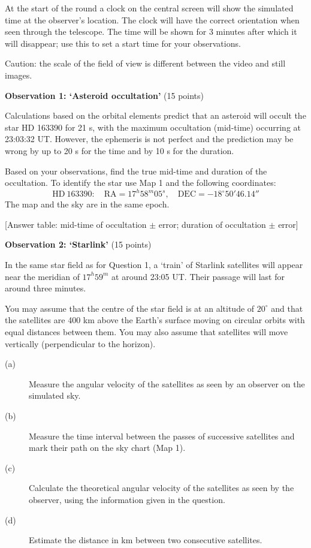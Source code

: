 At the start of the round a clock on the central screen will show the
simulated time at the observer's location. The clock will have the correct
orientation when seen through the telescope. The time will be shown for 3
minutes after which it will disappear; use this to set a start time for your
observations.

Caution: the scale of the field of view is different between the video and
still images.

\medskip
\textbf{Observation 1: `Asteroid occultation'} (15 points)

Calculations based on the orbital elements predict that an asteroid will
occult the star HD 163390 for 21 s, with the maximum occultation (mid-time)
occurring at 23:03:32 UT. However, the ephemeris is not perfect and the
prediction may be wrong by up to 20 s for the time and by 10 s for the
duration.

Based on your observations, find the true mid-time and duration of the
occultation. To identify the star use Map 1 and the following coordinates:
\[ \mathrm{HD\ 163390:}\quad \mathrm{RA} = 17^h58^m05^s, \quad
   \mathrm{DEC} = -18^\circ 50' 46.14'' \]
The map and the sky are in the same epoch.

[Answer table: mid-time of occultation $\pm$ error; duration of occultation
$\pm$ error]


\medskip
\textbf{Observation 2: `Starlink'} (15 points)

In the same star field as for Question 1, a `train' of Starlink satellites
will appear near the meridian of $17^h59^m$ at around 23:05 UT. Their
passage will last for around three minutes.

You may assume that the centre of the star field is at an altitude of
$20^\circ$ and that the satellites are 400 km above the Earth's surface
moving on circular orbits with equal distances between them. You may also
assume that satellites will move vertically (perpendicular to the horizon).

\begin{description}
\item[(a)] Measure the angular velocity of the satellites as seen by an
  observer on the simulated sky.
\item[(b)] Measure the time interval between the passes of successive
  satellites and mark their path on the sky chart (Map 1).
\item[(c)] Calculate the theoretical angular velocity of the satellites as
  seen by the observer, using the information given in the question.
\item[(d)] Estimate the distance in km between two consecutive satellites.
\end{description}

